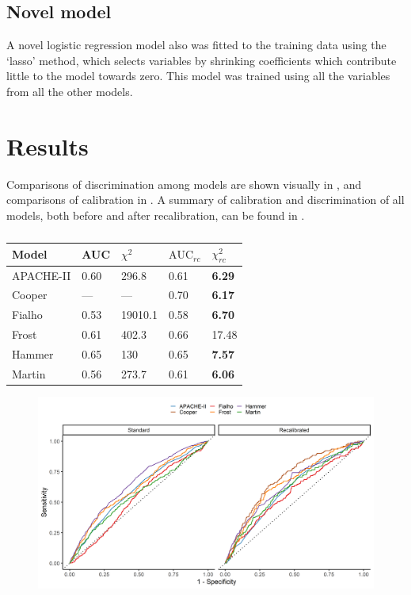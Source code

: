 \documentclass[onecolumn]{article}
\begin{document}
\subsection{Novel model}

A novel logistic regression model also was fitted to the training data using the `lasso' method, which selects variables by shrinking coefficients which contribute little to the model towards zero. This model was trained using all the variables from all the other models.

\section{Results}

Comparisons of discrimination among models are shown visually in , and comparisons of calibration in . A summary of calibration and discrimination of all models, both before and after recalibration, can be found in .


\begin{table}
\centering
	\renewcommand{\arraystretch}{1.4}
		\caption{}%
		\begin{tabular}{lllll}
		\hline
		Model & AUC & $ \chi^{2} $ & $ \mathrm{AUC}_{rc} $ & $ \chi^{2}_{rc} $\\
		\hline
		APACHE-II & 0.60 & 296.8 & 0.61 & \textbf{6.29}\\
		Cooper & --- & --- & 0.70 & \textbf{6.17}\\
		Fialho & 0.53 & 19010.1 & 0.58 & \textbf{6.70}\\
		Frost & 0.61 & 402.3 & 0.66 & 17.48\\
		Hammer & 0.65 & 130 & 0.65 & \textbf{7.57}\\
		Martin & 0.56 & 273.7 & 0.61 & \textbf{6.06}\\
		\hline
		\end{tabular}
	\label{ModelComparisonTable}
\end{table}


\begin{figure}
\centering
	\includegraphics[width=\textwidth]{discrimination.png}
	\caption{}
	\label{DiscriminationFig}
\end{figure}
\end{document}
